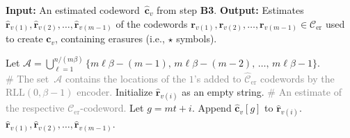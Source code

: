 \documentclass[journal,letterpaper,onecolumn,11pt]{IEEEtran}
\newcommand{\cA}{\mathcal{A}}
\newcommand{\cC}{\mathcal{C}}
\newcommand{\boldc}{\mathbf{c}}
\newcommand{\boldf}{\mathbf{f}}
\newcommand{\boldr}{\mathbf{r}}
\newcommand{\bolds}{\mathbf{s}}
\newcommand{\boldy}{\mathbf{y}}
\newcommand{\gray}[1]{\textcolor{gray}{#1}}
\begin{document}
\begin{algorithm}
\caption{Extraction of $\cC_{\mathrm{er}}$-codeword estimates from globally aligned fragments}
\begin{algorithmic}[1]\label{algorithm:retrieve Cer from aligned fragments}
\STATE \textbf{Input:} An estimated codeword~$\hat{\boldc}_v$ from step \textbf{B3}.
\STATE \textbf{Output:} Estimates
$\hat{\boldr}_{v(1)},\hat{\boldr}_{v(2)},\dots,
\hat{\boldr}_{v(m-1)}$ of the codewords $\boldr_{v(1)},\boldr_{v(2)},\dots,
\boldr_{v(m-1)}\in \cC_{\mathrm{er}}$ used to create $\boldc_v$, containing erasures (i.e., $\star$ symbols).



\STATE Let $\mathcal{A}=\bigcup_{\ell=1}^{n/(m\beta)}\{m\ell\beta-(m-1),\,m\ell\beta-(m-2),\,\dots,\,m\ell\beta-1\}$.\\
\gray{\# The set~$\cA$ contains the locations of the $1$'s added to $\hat{\cC}_{\mathrm{er}}$ codewords by the
$\mathrm{RLL}(0,\beta-1)$ encoder.}
\label{line:algorithm3 line begin for}
    \STATE Initialize $\hat{\boldr}_{v(i)}$ as an empty string. \gray{\# An estimate of the respective $\cC_{\mathrm{er}}$-codeword.}
        \STATE Let $g=mt+i$.
        \label{line:algorithm3 check conditions of g in mathcal A}
            \STATE Append $\hat{\boldc}_v[g]$ to $\hat{\boldr}_{v(i)}$.\label{line:algorithm3 lineappend bold cv}
        \ENDIF
    \ENDFOR
\ENDFOR\label{line:algorithm3 lineend for}
\RETURN $\hat{\boldr}_{v(1)},\hat{\boldr}_{v(2)},\dots, \hat{\boldr}_{v(m-1)}$.
\end{algorithmic}
\end{algorithm}
\end{document}
